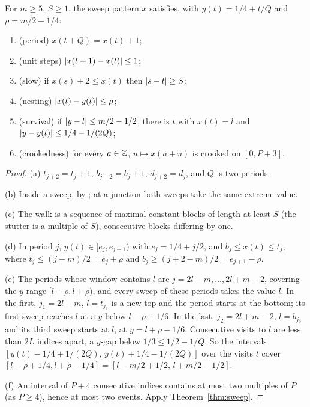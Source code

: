 
\begin{theorem}\label{thm:sweep-pattern}
For $m\ge5$, $S\ge1$, the sweep pattern $x$ satisfies, with $y(t)=1/4+t/Q$ and $\rho=m/2-1/4$:
\begin{enumerate}[label=(\alph*)]
\item (period) $x(t+Q)=x(t)+1$;
\item (unit steps) $\left\lvert x(t+1)-x(t)\right\rvert\le1$;
\item (slow) if $x(s)+2\le x(t)$ then $\left\lvert s-t\right\rvert\ge S$;
\item (nesting) $\left\lvert x(t)-y(t)\right\rvert\le\rho$;
\item (survival) if $\left\lvert y-l\right\rvert\le m/2-1/2$, there is $t$ with $x(t)=l$ and $\left\lvert y-y(t)\right\rvert\le1/4-1/(2Q)$;
\item (crookedness) for every $a\in\mathbb{Z}$, $u\mapsto x(a+u)$ is crooked on $[0,P+3]$.
\end{enumerate}
\end{theorem}

\begin{proof}
(a) $t_{j+2}=t_j+1$, $b_{j+2}=b_j+1$, $d_{j+2}=d_j$, and $Q$ is two periods.

(b) Inside a sweep, by ; at a junction both sweeps take the same extreme value.

(c) The walk is a sequence of maximal constant blocks of length at least $S$ (the stutter is a multiple of $S$), consecutive blocks differing by one.

(d) In period $j$, $y(t)\in[e_j,e_{j+1})$ with $e_j=1/4+j/2$, and $b_j\le x(t)\le t_j$, where $t_j\le(j+m)/2=e_j+\rho$ and $b_j\ge(j+2-m)/2=e_{j+1}-\rho$.

(e) The periods whose window contains $l$ are $j=2l-m,\dots,2l+m-2$, covering the $y$-range $[l-\rho,l+\rho)$, and every sweep of these periods takes the value $l$. In the first,
$j_1=2l-m$, $l=t_{j_1}$ is a new top and the period starts at the bottom; its first sweep reaches $l$ at a $y$ below $l-\rho+1/6$. In the last, $j_2=2l+m-2$, $l=b_{j_2}$ and its third sweep
starts at $l$, at $y=l+\rho-1/6$. Consecutive visits to $l$ are less than $2L$ indices apart, a $y$-gap below $1/3\le1/2-1/Q$. So the intervals $[y(t)-1/4+1/(2Q),\,y(t)+1/4-1/(2Q)]$ over
the visits $t$ cover $[l-\rho+1/4,l+\rho-1/4]=[l-m/2+1/2,\,l+m/2-1/2]$.

(f) An interval of $P+4$ consecutive indices contains at most two multiples of $P$ (as $P\ge4$), hence at most two events. Apply Theorem~\ref{thm:sweep}.
\end{proof}

